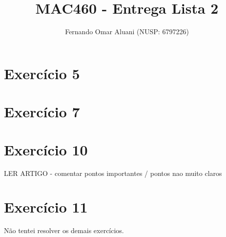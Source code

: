 \documentclass[a4paper,11pt]{article}
\title{MAC460 - Entrega Lista 2}
\author{Fernando Omar Aluani (NUSP: 6797226)}
\begin{document}
\maketitle

\section{Exercício 5}

\section{Exercício 7}

\section{Exercício 10}

LER ARTIGO - comentar pontos importantes / pontos nao muito claros

\section{Exercício 11}

Não tentei resolver os demais exercícios.
\end{document}
